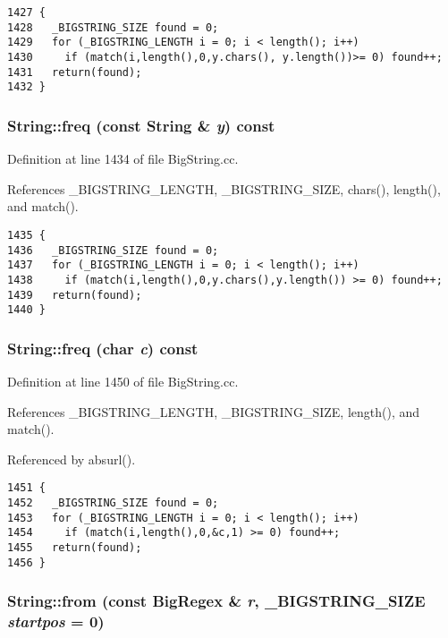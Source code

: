 \footnotesize\begin{verbatim}1427 {
1428   _BIGSTRING_SIZE found = 0;
1429   for (_BIGSTRING_LENGTH i = 0; i < length(); i++) 
1430     if (match(i,length(),0,y.chars(), y.length())>= 0) found++;
1431   return(found);
1432 }
\end{verbatim}\normalsize 
{}
\subsubsection{ String::freq (const String \& {\em y}) const}\label{classString_a48}




Definition at line 1434 of file Big\-String.cc.

References \_\-BIGSTRING\_\-LENGTH, \_\-BIGSTRING\_\-SIZE, chars(), length(), and match().



\footnotesize\begin{verbatim}1435 {
1436   _BIGSTRING_SIZE found = 0;
1437   for (_BIGSTRING_LENGTH i = 0; i < length(); i++) 
1438     if (match(i,length(),0,y.chars(),y.length()) >= 0) found++;
1439   return(found);
1440 }
\end{verbatim}\normalsize 
{}
\subsubsection{ String::freq (char {\em c}) const}\label{classString_a47}




Definition at line 1450 of file Big\-String.cc.

References \_\-BIGSTRING\_\-LENGTH, \_\-BIGSTRING\_\-SIZE, length(), and match().

Referenced by absurl().



\footnotesize\begin{verbatim}1451 {
1452   _BIGSTRING_SIZE found = 0;
1453   for (_BIGSTRING_LENGTH i = 0; i < length(); i++) 
1454     if (match(i,length(),0,&c,1) >= 0) found++;
1455   return(found);
1456 }
\end{verbatim}\normalsize 
{}
\subsubsection{ String::from (const {\bf Big\-Regex} \& {\em r}, {\bf \_\-BIGSTRING\_\-SIZE} {\em startpos} = 0)}\label{classString_a75}




